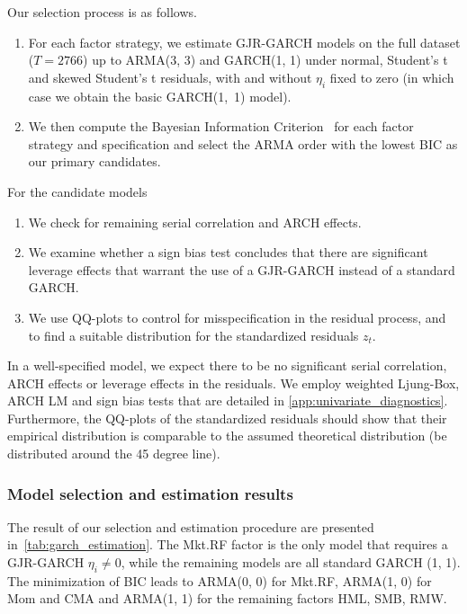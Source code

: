 Our selection process is as follows.

\begin{enumerate}{(i)}
  \item For each factor strategy, we estimate GJR-GARCH models on the full dataset ($T = 2766$) up to ARMA(3, 3) and GARCH(1, 1) under normal, Student's t and skewed Student's t residuals, with and without $\eta_i$ fixed to zero (in which case we obtain the basic GARCH(1,~1) model).
  \item We then compute the Bayesian Information Criterion~\autocite[BIC]{Schwarz1978} for each factor strategy and specification and select the ARMA order with the lowest BIC as our primary candidates.
\end{enumerate}

For the candidate models

\begin{enumerate}{(i)}
  \item We check for remaining serial correlation and ARCH effects.
  \item We examine whether a sign bias test concludes that there are significant leverage effects that warrant the use of a GJR-GARCH instead of a standard GARCH.
  \item We use QQ-plots to control for misspecification in the residual process, and to find a suitable distribution for the standardized residuals $z_t$.
\end{enumerate}

In a well-specified model, we expect there to be no significant serial correlation, ARCH effects or leverage effects in the residuals. We employ weighted Ljung-Box, ARCH LM and sign bias tests that are detailed in \autoref{app:univariate_diagnostics}. Furthermore, the QQ-plots of the standardized residuals should show that their empirical distribution is comparable to the assumed theoretical distribution (be distributed around the 45 degree line).

\subsubsection{Model selection and estimation results}

The result of our selection and estimation procedure are presented in~\autoref{tab:garch_estimation}. The Mkt.RF factor is the only model that requires a GJR-GARCH $\eta_i \neq 0$, while the remaining models are all standard GARCH (1, 1). The minimization of BIC leads to ARMA(0, 0) for Mkt.RF, ARMA(1, 0) for Mom and CMA and ARMA(1, 1) for the remaining factors HML, SMB, RMW. 

